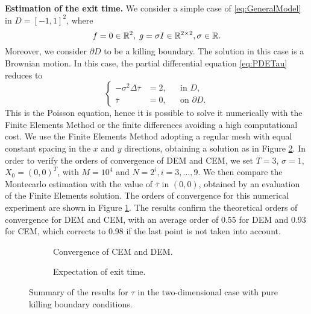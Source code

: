 
\vspace{2mm}
\noindent \textbf{Estimation of the exit time.} We consider a simple case of \eqref{eq:GeneralModel} in $D = [-1,1]^2$, where
\begin{equation*}
	f = 0 \in \mathbb{R}^2, \; g = \sigma I\in \mathbb{R}^{2\times 2}, \sigma \in \mathbb{R}.
\end{equation*}
Moreover, we consider $\partial D$ to be a killing boundary. The solution in this case is a Brownian motion. In this case, the partial differential equation \eqref{eq:PDETau} reduces to
\begin{equation}\label{eq:PDETau2DKilling}
	\left \{
  	\begin{aligned}
	- \sigma^2 \Delta \bar \tau &= 2, && \text{in } D, \\
	\bar \tau &= 0, && \text{on } \partial D.
	\end{aligned} \right.
\end{equation}
This is the Poisson equation, hence it is possible to solve it numerically with the Finite Elements Method or the finite differences avoiding a high computational cost. We use the Finite Elements Method adopting a regular mesh with equal constant spacing in the $x$ and $y$ directions, obtaining a solution as in Figure \ref{fig:TauExact2DKill}. In order to verify the orders of convergence of DEM and CEM, we set $T = 3$, $\sigma = 1$, $X_0 = (0,0)^T$, with $M = 10^4$ and $N = 2^i,i=3,\dots,9$. We then compare the Montecarlo estimation with the value of $\bar\tau$ in $(0,0)$, obtained by an evaluation of the Finite Elements solution. The orders of convergence for this numerical experiment are shown in Figure \ref{fig:KillTwoD}. The results confirm the theoretical orders of convergence for DEM and CEM, with an average order of 0.55 for DEM and 0.93 for CEM, which corrects to 0.98 if the last point is not taken into account.

\begin{figure}[t]
    \centering
    \begin{subfigure}{0.49\linewidth}
        \centering
        \resizebox{1\linewidth}{!}{ }  
        \caption{Convergence of CEM and DEM.}
        \label{fig:KillTwoD}
    \end{subfigure}
    \begin{subfigure}{0.49\linewidth}
        \centering
        \resizebox{1\linewidth}{!}{ }  
        \caption{Expectation of exit time.}
        \label{fig:TauExact2DKill}
    \end{subfigure}    
    \caption{Summary of the results for $\tau$ in the two-dimensional case with pure killing boundary conditions.}
    \label{fig:OrdersTwoDKill}
\end{figure}

